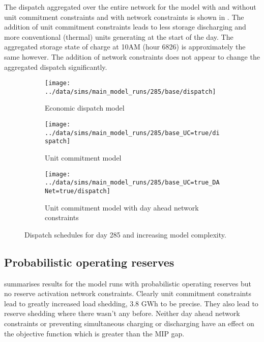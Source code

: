 \documentclass[number,times]{elsarticle}
\begin{document}
The dispatch aggregated over the entire network for the model with and without unit commitment constraints and with network constraints is shown in . The addition of unit commitment constraints leads to less storage discharging and more conventional (thermal) units generating at the start of the day. The aggregated storage state of charge at 10AM (hour 6826) is approximately the same however. The addition of network constraints does not appear to change the aggregated dispatch significantly.

\begin{figure}[H]
    \centering
    \begin{subfigure}[t]{0.7\textwidth}
        \centering
        \texttt{[image: ../data/sims/main\_model\_runs/285/base/dispatch]}
        \caption{Economic dispatch model}
    \end{subfigure}
    \begin{subfigure}[t]{0.7\textwidth}
        \centering
        \texttt{[image: ../data/sims/main\_model\_runs/285/base\_UC=true/dispatch]}
        \caption{Unit commitment model}
    \end{subfigure}
    \begin{subfigure}[t]{0.7\textwidth}
        \centering
        \texttt{[image: ../data/sims/main\_model\_runs/285/base\_UC=true\_DANet=true/dispatch]}
        \caption{Unit commitment model with day ahead network constraints}
    \end{subfigure}
    \caption{Dispatch schedules for day 285 and increasing model complexity.\label{fig:dispatch_base}}
\end{figure}

\subsection{Probabilistic operating reserves}

 summarises results for the model runs with probabilistic operating reserves but no reserve activation network constraints. Clearly unit commitment constraints lead to greatly increased load shedding, 3.8 GWh to be precise. They also lead to reserve shedding where there wasn't any before. Neither day ahead network constraints or preventing simultaneous charging or discharging have an effect on the objective function which is greater than the MIP gap.
\end{document}
